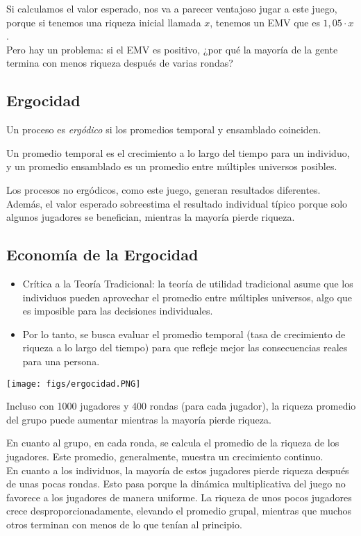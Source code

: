 \documentclass{article}
\begin{document}
            Si calculamos el valor esperado, nos va a parecer ventajoso jugar a este juego, porque si tenemos una riqueza inicial llamada $x$, tenemos un EMV que es $1,05 \cdot x$.\\
            Pero hay un problema: si el EMV es positivo, ¿por qué la mayoría de la gente termina con menos riqueza después de varias rondas?
        \subsection*{Ergocidad}
            Un proceso es \emph{ergódico} si los promedios temporal y ensamblado coinciden.

            Un promedio temporal es el crecimiento a lo largo del tiempo para un individuo, y un promedio ensamblado es un promedio entre múltiples universos posibles.

            Los procesos no ergódicos, como este juego, generan resultados diferentes. Además, el valor esperado sobreestima el resultado individual típico porque solo algunos jugadores se benefician, mientras la mayoría pierde riqueza.
        \subsection*{Economía de la Ergocidad}
            \begin{itemize}
                \item Crítica a la Teoría Tradicional: la teoría de utilidad tradicional asume que los individuos pueden aprovechar el promedio entre múltiples universos, algo que es imposible para las decisiones individuales.
                \item Por lo tanto, se busca evaluar el promedio temporal (tasa de crecimiento de riqueza a lo largo del tiempo) para que refleje mejor las consecuencias reales para una persona.
            \end{itemize}
            \begin{center}
                \texttt{[image: figs/ergocidad.PNG]}
            \end{center}
             Incluso con 1000 jugadores y 400 rondas (para cada jugador), la riqueza promedio del grupo puede aumentar mientras la mayoría pierde riqueza.

             En cuanto al grupo, en cada ronda, se calcula el promedio de la riqueza de los jugadores. Este promedio, generalmente, muestra un crecimiento continuo. \\
             En cuanto a los individuos, la mayoría de estos jugadores pierde riqueza después de unas pocas rondas. Esto pasa porque la dinámica multiplicativa del juego no favorece a los jugadores de manera uniforme. La riqueza de unos pocos jugadores crece desproporcionadamente, elevando el promedio grupal, mientras que muchos otros terminan con menos de lo que tenían al principio.
\end{document}
